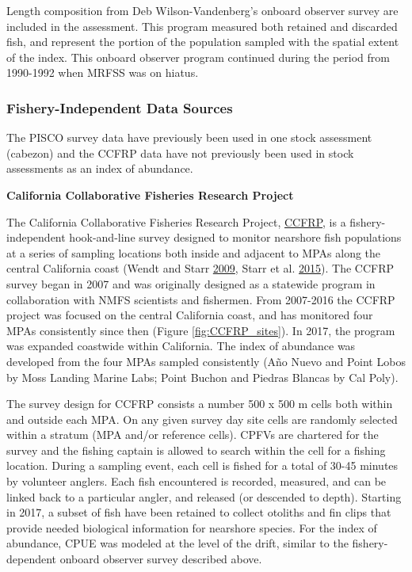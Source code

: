\documentclass[12pt,]{article}
\begin{document}
Length composition from Deb Wilson-Vandenberg's onboard observer survey
are included in the assessment. This program measured both retained and
discarded fish, and represent the portion of the population sampled with
the spatial extent of the index. This onboard observer program continued
during the period from 1990-1992 when MRFSS was on hiatus.

\subsubsection{Fishery-Independent Data
Sources}\label{fishery-independent-data-sources}

The PISCO survey data have previously been used in one stock assessment
(cabezon) and the CCFRP data have not previously been used in stock
assessments as an index of abundance.

\textbf{California Collaborative Fisheries Research Project}

The California Collaborative Fisheries Research Project,
\href{https://www.mlml.calstate.edu/ccfrp/}{CCFRP}, is a
fishery-independent hook-and-line survey designed to monitor nearshore
fish populations at a series of sampling locations both inside and
adjacent to MPAs along the central California coast (Wendt and Starr
\protect\hyperlink{ref-Wendt2009}{2009}, Starr et al.
\protect\hyperlink{ref-Starr2015}{2015}). The CCFRP survey began in 2007
and was originally designed as a statewide program in collaboration with
NMFS scientists and fishermen. From 2007-2016 the CCFRP project was
focused on the central California coast, and has monitored four MPAs
consistently since then (Figure \ref{fig:CCFRP_sites}). In 2017, the
program was expanded coastwide within California. The index of abundance
was developed from the four MPAs sampled consistently (Año Nuevo and
Point Lobos by Moss Landing Marine Labs; Point Buchon and Piedras
Blancas by Cal Poly).

The survey design for CCFRP consists a number 500 x 500 m cells both
within and outside each MPA. On any given survey day site cells are
randomly selected within a stratum (MPA and/or reference cells). CPFVs
are chartered for the survey and the fishing captain is allowed to
search within the cell for a fishing location. During a sampling event,
each cell is fished for a total of 30-45 minutes by volunteer anglers.
Each fish encountered is recorded, measured, and can be linked back to a
particular angler, and released (or descended to depth). Starting in
2017, a subset of fish have been retained to collect otoliths and fin
clips that provide needed biological information for nearshore species.
For the index of abundance, CPUE was modeled at the level of the drift,
similar to the fishery-dependent onboard observer survey described
above.
\end{document}
